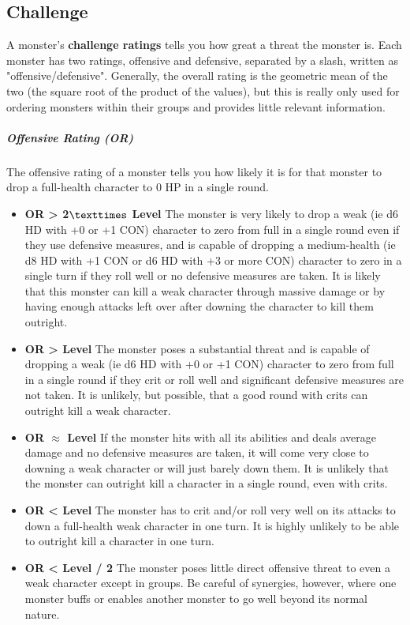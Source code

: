 \subsection{Challenge}

A monster's \textbf*{challenge ratings} tells you how great a threat the monster is. Each monster has two ratings, offensive and defensive, separated by a slash, written as "offensive/defensive". Generally, the overall rating is the geometric mean of the two (the square root of the product of the values), but this is really only used for ordering monsters within their groups and provides little relevant information.

\subparagraph*{Offensive Rating (OR)} The offensive rating of a monster tells you how likely it is for that monster to drop a full-health character to 0 HP in a single round.

\begin{itemize}
	\item[] \textbf{OR > 2$\texttimes$ Level} The monster is very likely to drop a weak (ie d6 HD with +0 or +1 CON) character to zero from full in a single round even if they use defensive measures, and is capable of dropping a medium-health (ie d8 HD with +1 CON or d6 HD with +3 or more CON) character to zero in a single turn if they roll well or no defensive measures are taken. It is likely that this monster can kill a weak character through massive damage or by having enough attacks left over after downing the character to kill them outright.
	\item[] \textbf{OR > Level} The monster poses a substantial threat and is capable of dropping a weak (ie d6 HD with +0 or +1 CON) character to zero from full in a single round if they crit or roll well and significant defensive measures are not taken. It is unlikely, but possible, that a good round with crits can outright kill a weak character.
	\item[] \textbf{OR $\approx$ Level} If the monster hits with all its abilities and deals average damage and no defensive measures are taken, it will come very close to downing a weak character or will just barely down them. It is unlikely that the monster can outright kill a character in a single round, even with crits.
	\item[] \textbf{OR < Level} The monster has to crit and/or roll very well on its attacks to down a full-health weak character in one turn. It is highly unlikely to be able to outright kill a character in one turn.
	\item[] \textbf{OR < Level / 2} The monster poses little direct offensive threat to even a weak character except in groups. Be careful of synergies, however, where one monster buffs or enables another monster to go well beyond its normal nature.
\end{itemize}


